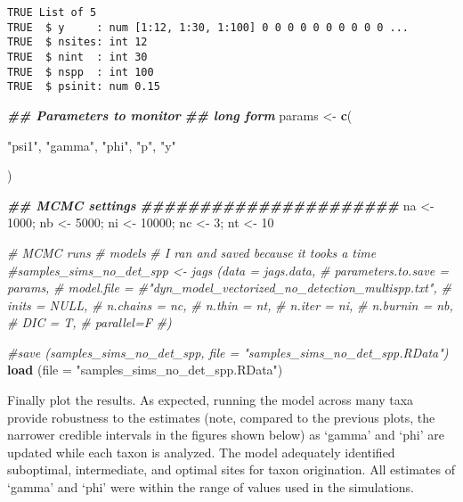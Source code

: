 \documentclass[
]{article}
\newenvironment{Shaded}{\begin{snugshade}}{\end{snugshade}}
\newcommand{\AttributeTok}[1]{\textcolor[rgb]{0.13,0.29,0.53}{#1}}
\newcommand{\CommentTok}[1]{\textcolor[rgb]{0.56,0.35,0.01}{\textit{#1}}}
\newcommand{\DecValTok}[1]{\textcolor[rgb]{0.00,0.00,0.81}{#1}}
\newcommand{\DocumentationTok}[1]{\textcolor[rgb]{0.56,0.35,0.01}{\textbf{\textit{#1}}}}
\newcommand{\FunctionTok}[1]{\textcolor[rgb]{0.13,0.29,0.53}{\textbf{#1}}}
\newcommand{\NormalTok}[1]{#1}
\newcommand{\OtherTok}[1]{\textcolor[rgb]{0.56,0.35,0.01}{#1}}
\newcommand{\StringTok}[1]{\textcolor[rgb]{0.31,0.60,0.02}{#1}}
\begin{document}
\begin{verbatim}
TRUE List of 5
TRUE  $ y     : num [1:12, 1:30, 1:100] 0 0 0 0 0 0 0 0 0 0 ...
TRUE  $ nsites: int 12
TRUE  $ nint  : int 30
TRUE  $ nspp  : int 100
TRUE  $ psinit: num 0.15
\end{verbatim}

\begin{Shaded}
\begin{Highlighting}[]
\DocumentationTok{\#\# Parameters to monitor}
\DocumentationTok{\#\# long form}
\NormalTok{params }\OtherTok{\textless{}{-}} \FunctionTok{c}\NormalTok{(}
  
  \StringTok{"psi1"}\NormalTok{,}
  \StringTok{"gamma"}\NormalTok{, }
  \StringTok{"phi"}\NormalTok{,}
  \StringTok{"p"}\NormalTok{,}
  \StringTok{"y"}
  
\NormalTok{)}

\DocumentationTok{\#\# MCMC settings}
\DocumentationTok{\#\#\#\#\#\#\#\#\#\#\#\#\#\#\#\#\#\#\#\#\#\#}
\NormalTok{na }\OtherTok{\textless{}{-}} \DecValTok{1000}\NormalTok{; nb }\OtherTok{\textless{}{-}} \DecValTok{5000}\NormalTok{; ni }\OtherTok{\textless{}{-}} \DecValTok{10000}\NormalTok{; nc }\OtherTok{\textless{}{-}} \DecValTok{3}\NormalTok{; nt }\OtherTok{\textless{}{-}} \DecValTok{10}

\CommentTok{\# MCMC runs}
\CommentTok{\# models}
\CommentTok{\# I ran and saved because it tooks a time}
\CommentTok{\#samples\_sims\_no\_det\_spp \textless{}{-} jags (data = jags.data, }
\CommentTok{\#                             parameters.to.save = params, }
\CommentTok{\#                             model.file = \#"dyn\_model\_vectorized\_no\_detection\_multispp.txt", }
\CommentTok{\#                             inits = NULL, }
\CommentTok{\#                             n.chains = nc, }
\CommentTok{\#                             n.thin = nt, }
\CommentTok{\#                             n.iter = ni, }
\CommentTok{\#                             n.burnin = nb, }
\CommentTok{\#                             DIC = T,  }
\CommentTok{\#                             parallel=F}
\CommentTok{\#)}

\CommentTok{\#save (samples\_sims\_no\_det\_spp, file = "samples\_sims\_no\_det\_spp.RData")}
\FunctionTok{load}\NormalTok{ (}\AttributeTok{file =} \StringTok{"samples\_sims\_no\_det\_spp.RData"}\NormalTok{)}
\end{Highlighting}
\end{Shaded}

Finally plot the results. As expected, running the model across many
taxa provide robustness to the estimates (note, compared to the previous
plots, the narrower credible intervals in the figures shown below) as
`gamma' and `phi' are updated while each taxon is analyzed. The model
adequately identified suboptimal, intermediate, and optimal sites for
taxon origination. All estimates of `gamma' and `phi' were within the
range of values used in the simulations.
\end{document}
